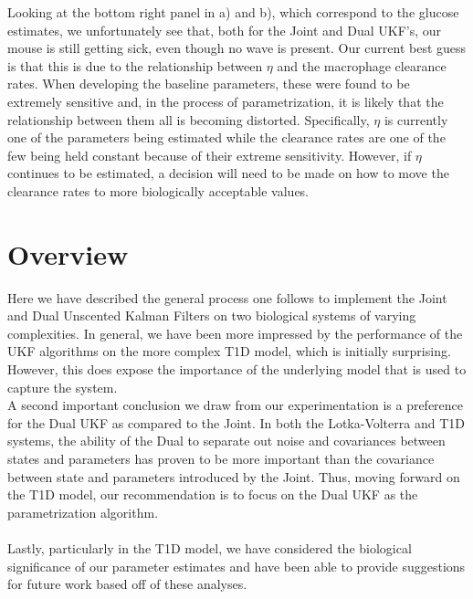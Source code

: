 \documentclass{article}
\begin{document}
Looking at the bottom right panel in a) and b), which correspond to the glucose estimates, we unfortunately see that, both for the Joint and Dual UKF's, our mouse is still getting sick, even though no wave is present. Our current best guess is that this is due to the relationship between $\eta$ and the macrophage clearance rates. When developing the baseline parameters, these were found to be extremely sensitive and, in the process of parametrization, it is likely that the relationship between them all is becoming distorted. Specifically, $\eta$ is currently one of the parameters being estimated while the clearance rates are one of the few being held constant because of their extreme sensitivity. However, if $\eta$ continues to be estimated, a decision will need to be made on how to move the clearance rates to more biologically acceptable values.

\section{Overview}
Here we have described the general process one follows to implement the Joint and Dual Unscented Kalman Filters on two biological systems of varying complexities. In general, we have been more impressed by the performance of the UKF algorithms on the more complex T1D model, which is initially surprising. However, this does expose the importance of the underlying model that is used to capture the system. 
\\
A second important conclusion we draw from our experimentation is a preference for the Dual UKF as compared to the Joint. In both the Lotka-Volterra and T1D systems, the ability of the Dual to separate out noise and covariances between states and parameters has proven to be more important than the covariance between state and parameters introduced by the Joint. Thus, moving forward on the T1D model, our recommendation is to focus on the Dual UKF as the parametrization algorithm.\\
\\
Lastly, particularly in the T1D model, we have considered the biological significance of our parameter estimates and have been able to provide suggestions for future work based off of these analyses.
\end{document}
